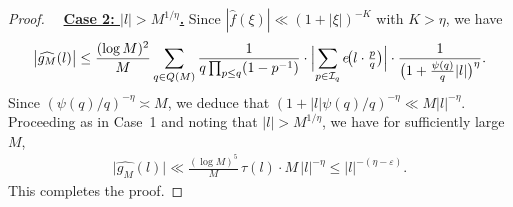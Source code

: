 \documentclass[10pt,a4paper]{amsart}
\begin{document}
\begin{proof}
\medskip

\noindent{}~~\underline{\textbf{Case 2: $|l| > M^{1/\eta}$.}}
Since $|\widehat{f}(\xi)| \ll (1+|\xi|)^{-K}$ with $K>\eta$, we have
\[
\bigl|\widehat{g_M}(l)\bigr|
\le \frac{(\log M)^2}{M} \sum_{q\in Q(M)} \frac{1}{q\prod_{p\le q}(1-p^{-1})} \cdot \Bigl|\sum_{p\in\mathcal{I}_q} e\!\bigl(l\cdot \tfrac{p}{q}\bigr)\Bigr| \cdot \frac{1}{\bigl(1+\frac{\psi(q)}{q}|l|\bigr)^{\eta}}.
\]
Since $({\psi(q)}/{q})^{-\eta}\asymp M$, we deduce that  $(1+ |l|{\psi(q)}/{q})^{-\eta}\ll M|l|^{-\eta}$. Proceeding as in Case~1 and noting that \(|l| > M^{1/\eta}\), we have for sufficiently large \(M\),
\begin{align*}
\bigl|\widehat{g_M}(l)\bigr|
\ll \frac{(\log M)^5}{M} \, \tau(l) \cdot M \, |l|^{-\eta}
\le |l|^{-(\eta-\varepsilon)}.
\end{align*}
This completes the proof.


\end{proof}
\end{document}
